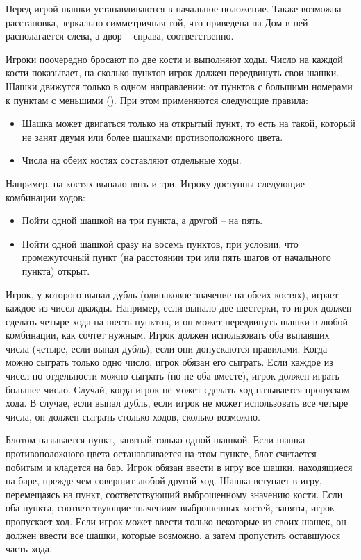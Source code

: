 Перед игрой шашки устанавливаются в начальное положение. Также возможна расстановка, зеркально симметричная той, что приведена на  Дом в ней располагается слева, а двор -- справа, соответственно.


Игроки поочередно бросают по две кости и выполняют ходы. Число на каждой кости показывает, на сколько пунктов игрок должен передвинуть свои шашки. Шашки движутся только в одном направлении: от пунктов с большими номерами к пунктам с меньшими (). При этом применяются следующие правила:
\begin{itemize}
    \item Шашка может двигаться только на открытый пункт, то есть на такой, который не занят двумя или более шашками противоположного цвета.
    \item Числа на обеих костях составляют отдельные ходы.
\end{itemize}


Например, на костях выпало пять и три. Игроку доступны следующие комбинации ходов:
\begin{itemize}
    \item Пойти одной шашкой на три пункта, а другой -- на пять.
    \item Пойти одной шашкой сразу на восемь пунктов, при условии, что промежуточный пункт (на расстоянии три или пять шагов от начального пункта) открыт.
\end{itemize}

Игрок, у которого выпал дубль (одинаковое значение на обеих костях), играет каждое из чисел дважды. Например, если выпало две шестерки, то игрок должен сделать четыре хода на шесть пунктов, и он может передвинуть шашки в любой комбинации, как сочтет нужным. Игрок должен использовать оба выпавших числа (четыре, если выпал дубль), если они допускаются правилами. Когда можно сыграть только одно число, игрок обязан его сыграть. Если каждое из чисел по отдельности можно сыграть (но не оба вместе), игрок должен играть большее число. Случай, когда игрок не может сделать ход называется пропуском хода. В случае, если выпал дубль, если игрок не может использовать все четыре числа, он должен сыграть столько ходов, сколько возможно.

Блотом называется пункт, занятый только одной шашкой. Если шашка противоположного цвета останавливается на этом пункте, блот считается побитым и кладется на бар. Игрок обязан ввести в игру все шашки, находящиеся на баре, прежде чем совершит любой другой ход. Шашка вступает в игру, перемещаясь на пункт, соответствующий выброшенному значению кости. Если оба пункта, соответствующие значениям выброшенных костей, заняты, игрок пропускает ход. Если игрок может ввести только некоторые из своих шашек, он должен ввести все шашки, которые возможно, а затем пропустить оставшуюся часть хода.

